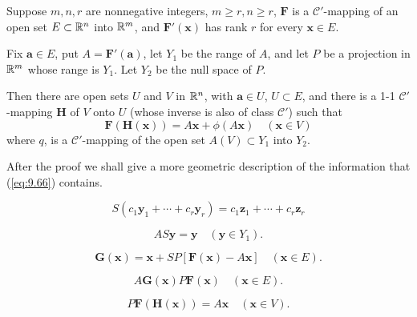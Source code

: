 \begin{thm}
    \label{thm:9.32}
    Suppose $m, n, r$ are nonnegative integers, $m \geq r, n \geq r$,
    $\mathbf{F}$ is a $\mathscr{C}'$-mapping of an open set $E \subset {\protect\mathbb R}^n$ into ${\protect\mathbb R}^m$,
    and $\mathbf{F'(x)}$ has rank $r$ for every $\mathbf{x} \in E$.

    Fix $\mathbf{a} \in E$, put $A = \mathbf{F'(a)}$,
    let $Y_1$ be the range of $A$,
    and let $P$ be a projection in ${\protect\mathbb R}^m$ whose range is $Y_1$.
    Let $Y_2$ be the null space of $P$.

    Then there are open sets $U$ and $V$ in ${\protect\mathbb R}^n$,
    with $\mathbf{a} \in U$, $U \subset E$,
    and there is a 1-1 $\mathscr{C'}$-mapping $\mathbf{H}$ of $V$ onto $U$
    (whose inverse is also of class $\mathscr{C'}$) such that
    \begin{equation}
        \label{eq:9.66}
        \mathbf{F(H(x))} = A\mathbf{x} + \phi(A\mathbf{x})
        \quad
        (\mathbf{x} \in V)
    \end{equation}
    where $q$, is a $\mathscr{C'}$-mapping of the open set $A(V) \subset Y_1$ into $Y_2$.
\end{thm}

After the proof we shall give a more geometric description of the information that (\ref{eq:9.66}) contains.



\begin{equation}
    \label{eq:9.67}
    S( c_1 \mathbf{y}_1 + \cdots + c_r \mathbf{y}_r ) =
    c_1 \mathbf{z}_1 + \cdots + c_r \mathbf{z}_r
\end{equation}


\begin{equation}
    \label{eq:9.68}
    AS \mathbf{y} = \mathbf{y}
    \quad
    (\mathbf{y} \in Y_1).
\end{equation}

\begin{equation}
    \label{eq:9.69}
    \mathbf{G(x)} =
    \mathbf{x} + SP[\mathbf{F(x)}-A\mathbf{x}]
    \quad
    (\mathbf{x} \in E).
\end{equation}


\begin{equation}
    \label{eq:9.70}
    A \mathbf{G(x)}
    P \mathbf{F(x)}
    \quad
    (\mathbf{x} \in E).
\end{equation}

\begin{equation}
    \label{eq:9.71}
    P \mathbf{F(H(x))} = A \mathbf{x}
    \quad
    (\mathbf{x} \in V).
\end{equation}

